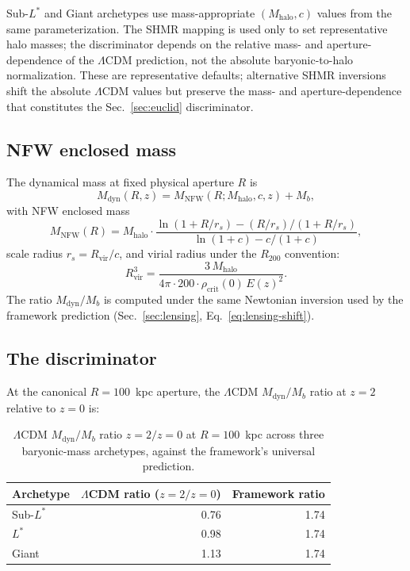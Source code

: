 \documentclass[
    aps,
    prd,
    reprint,
    superscriptaddress,
    nofootinbib,
    floatfix
]{revtex4-2}
\begin{document}
Sub-$L^*$ and Giant archetypes use mass-appropriate
$(M_\text{halo}, c)$ values from the same parameterization. The
SHMR mapping is used only to set representative halo masses; the
discriminator depends on the relative mass- and aperture-dependence
of the $\Lambda$CDM prediction, not the absolute baryonic-to-halo
normalization. These are representative defaults; alternative SHMR
inversions shift the absolute $\Lambda$CDM values but preserve the
mass- and aperture-dependence that constitutes the
Sec.~\ref{sec:euclid} discriminator.

\subsection{NFW enclosed mass}
\label{app:lensing-nfw}

The dynamical mass at fixed physical aperture $R$ is
\begin{equation*}
M_\text{dyn}(R, z) = M_\text{NFW}(R; M_\text{halo}, c, z) + M_b,
\end{equation*}
with NFW enclosed mass
\begin{equation*}
M_\text{NFW}(R) = M_\text{halo} \cdot
\frac{\ln(1 + R/r_s) - (R/r_s)/(1 + R/r_s)}
     {\ln(1 + c) - c/(1 + c)},
\end{equation*}
scale radius $r_s = R_\text{vir}/c$, and virial radius under the
$R_{200}$ convention:
\begin{equation*}
R_\text{vir}^3 = \frac{3\,M_\text{halo}}
                       {4\pi \cdot 200 \cdot \rho_\text{crit}(0)\,E(z)^2}.
\end{equation*}
The ratio $M_\text{dyn}/M_b$ is computed under the same Newtonian
inversion used by the framework prediction
(Sec.~\ref{sec:lensing}, Eq.~\ref{eq:lensing-shift}).

\subsection{The discriminator}
\label{app:lensing-discriminator}

At the canonical $R = 100$~kpc aperture, the $\Lambda$CDM
$M_\text{dyn}/M_b$ ratio at $z = 2$ relative to $z = 0$ is:

\begin{table}[h]
\caption{\label{tab:lcdm-mass}$\Lambda$CDM $M_\text{dyn}/M_b$
ratio $z=2/z=0$ at $R = 100$~kpc across three baryonic-mass
archetypes, against the framework's universal prediction.}
\begin{ruledtabular}
\begin{tabular}{lrr}
Archetype & $\Lambda$CDM ratio ($z{=}2/z{=}0$) & Framework ratio \\
\hline
Sub-$L^*$ & 0.76 & 1.74 \\
$L^*$     & 0.98 & 1.74 \\
Giant     & 1.13 & 1.74 \\
\end{tabular}
\end{ruledtabular}
\end{table}
\end{document}
